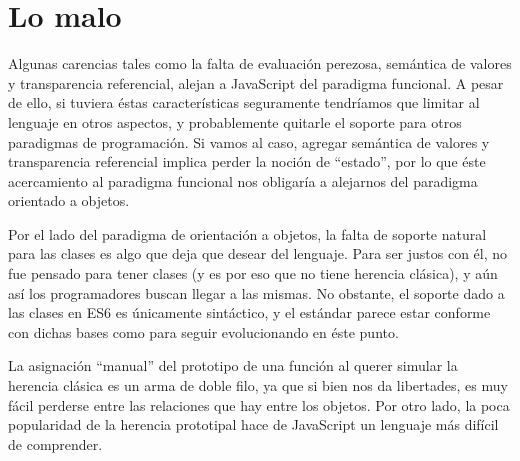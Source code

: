 \section*{Lo malo}

Algunas carencias tales como la falta de evaluación perezosa, semántica de valores y transparencia referencial, alejan a JavaScript del paradigma funcional. A pesar de ello, si tuviera éstas características seguramente tendríamos que limitar al lenguaje en otros aspectos, y probablemente quitarle el soporte para otros paradigmas de programación. Si vamos al caso, agregar semántica de valores y transparencia referencial implica perder la noción de "`estado"', por lo que éste acercamiento al paradigma funcional nos obligaría a alejarnos del paradigma orientado a objetos.

Por el lado del paradigma de orientación a objetos, la falta de soporte natural para las clases es algo que deja que desear del lenguaje. Para ser justos con él, no fue pensado para tener clases (y es por eso que no tiene herencia clásica), y aún así los programadores buscan llegar a las mismas. No obstante, el soporte dado a las clases en ES6 es únicamente sintáctico, y el estándar parece estar conforme con dichas bases como para seguir evolucionando en éste punto. 

La asignación "`manual"' del prototipo de una función al querer simular la herencia clásica es un arma de doble filo, ya que si bien nos da libertades, es muy fácil perderse entre las relaciones que hay entre los objetos. Por otro lado, la poca popularidad de la herencia prototipal hace de JavaScript un lenguaje más difícil de comprender.